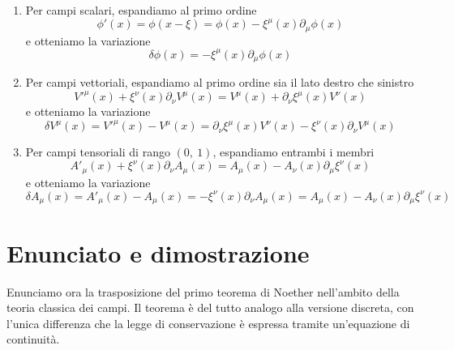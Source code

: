     \begin{enumerate}
        \item Per campi scalari, espandiamo al primo ordine
    \begin{equation*}
        \phi'(x) = \phi(x - \xi) = \phi(x) - \xi^\mu(x) \partial_\mu \phi(x)
    \end{equation*}  
        e otteniamo la variazione
    \begin{equation}\label{variazionescalare}
        \delta \phi(x) = - \xi^\mu(x) \partial_\mu \phi(x)
    \end{equation} 
        \item Per campi vettoriali, espandiamo al primo ordine sia il lato destro che sinistro
    \begin{equation*}
        V'^\mu(x) + \xi^\nu(x) \partial_\nu V^\mu (x) = V^\mu(x) + \partial_\nu \xi^\mu(x) V^\nu(x)
    \end{equation*}
        e otteniamo la variazione
    \begin{equation*}
        \delta V^\mu(x) = V'^\mu(x) - V^\mu(x) = \partial_\nu \xi^\mu(x) V^\nu(x) - \xi^\nu (x)\partial_\nu V^\mu(x)
    \end{equation*}
        \item Per campi tensoriali di rango $(0,~1)$, espandiamo entrambi i membri 
    \begin{equation*}
        A'_\mu(x) + \xi^\nu(x) \partial_\nu A_\mu (x) = A_\mu(x) - A_\nu(x) \partial_\mu \xi^\nu(x)
    \end{equation*}
        e otteniamo la variazione
    \begin{equation}\label{variazione10}
        \delta A_\mu(x) = A'_\mu(x) - A_\mu(x) = - \xi^\nu(x) \partial_\nu A_\mu (x) = A_\mu(x) - A_\nu(x) \partial_\mu \xi^\nu(x)
    \end{equation}
    \end{enumerate}

\section{Enunciato e dimostrazione}
    Enunciamo ora la trasposizione del primo teorema di Noether nell'ambito della teoria classica dei campi. Il teorema è del tutto analogo alla versione discreta, con l'unica differenza che la legge di conservazione è espressa tramite un'equazione di continuità.

